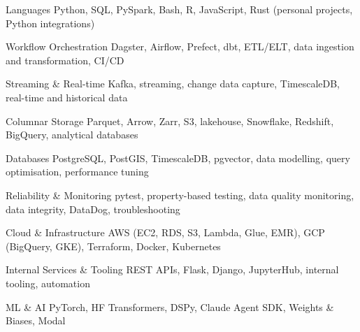 
\begin{cvskills}

  \cvskill
    {Languages}
    {Python, SQL, PySpark, Bash, R, JavaScript, Rust (personal projects, Python integrations)}

  \cvskill
    {Workflow Orchestration}
    {Dagster, Airflow, Prefect, dbt, ETL/ELT, data ingestion and transformation, CI/CD}

  \cvskill
    {Streaming \& Real-time}
    {Kafka, streaming, change data capture, TimescaleDB, real-time and historical data}

  \cvskill
    {Columnar Storage}
    {Parquet, Arrow, Zarr, S3, lakehouse, Snowflake, Redshift, BigQuery, analytical databases}

  \cvskill
    {Databases}
    {PostgreSQL, PostGIS, TimescaleDB, pgvector, data modelling, query optimisation, performance tuning}

  \cvskill
    {Reliability \& Monitoring}
    {pytest, property-based testing, data quality monitoring, data integrity, DataDog, troubleshooting}

  \cvskill
    {Cloud \& Infrastructure}
    {AWS (EC2, RDS, S3, Lambda, Glue, EMR), GCP (BigQuery, GKE), Terraform, Docker, Kubernetes}

  \cvskill
    {Internal Services \& Tooling}
    {REST APIs, Flask, Django, JupyterHub, internal tooling, automation}

  \cvskill
    {ML \& AI}
    {PyTorch, HF Transformers, DSPy, Claude Agent SDK, Weights \& Biases, Modal}

\end{cvskills}
